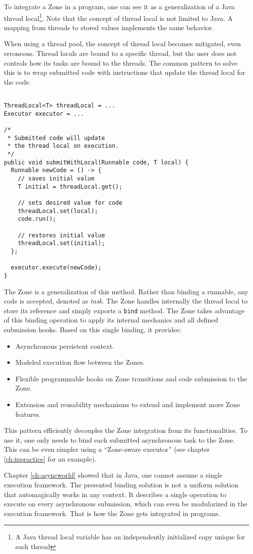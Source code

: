 To integrate a Zone in a program, one can see it as a generalization of a Java thread local\footnote{A Java thread local variable has an independently initialized copy unique for each thread}. Note that the concept of thread local is not limited to Java. A mapping from threads to stored values implements the same behavior.

When using a thread pool, the concept of thread local becomes mitigated, even erroneous. Thread locals are bound to a specific thread, but the user does not controls how its tasks are bound to the threads. The common pattern to solve this is to wrap submitted code with instructions that update the thread local for the code.
\begin{lstlisting}

ThreadLocal<T> threadLocal = ...
Executor executor = ...

/*
 * Submitted code will update
 * the thread local on execution.
 */
public void submitWithLocal(Runnable code, T local) {
  Runnable newCode = () -> {
    // saves initial value
    T initial = threadLocal.get();

    // sets desired value for code
    threadLocal.set(local);
    code.run();

    // restores initial value
    threadLocal.set(initial);
  };

  executor.execute(newCode);
}
\end{lstlisting}

The Zone is a generalization of this method. Rather than binding a runnable, any code is accepted, denoted as \emph{task}. The Zone handles internally the thread local to store its reference and simply exports a \lstinline{bind} method.
The Zone takes advantage of this binding operation to apply its internal mechanics and all defined submission hooks. Based on this single binding, it provides:
\begin{itemize}
\item Asynchronous persistent context.
\item Modeled execution flow between the Zones.
\item Flexible programmable hooks on Zone transitions and code submission to the Zone.
\item Extension and reusability mechanisms to extend and implement more Zone features.
\end{itemize}


This pattern efficiently decouples the Zone integration from its functionalities. To use it, one only needs to bind each submitted asynchronous task to the Zone. This can be even simpler using a ``Zone-aware executor'' (see chapter \ref{ch:inpractice} for an example).

Chapter \ref{ch:asyncworld} showed that in Java, one cannot assume a single execution framework. The presented binding solution is not a uniform solution that automagically works in any context. It describes a single operation to execute on every asynchronous submission, which can even be modularized in the execution framework. That is how the Zone gets integrated in programs.
